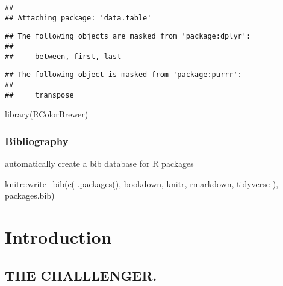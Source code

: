 \documentclass[
]{book}
\newenvironment{Shaded}{\begin{snugshade}}{\end{snugshade}}
\newcommand{\FunctionTok}[1]{\textcolor[rgb]{0.00,0.00,0.00}{#1}}
\newcommand{\NormalTok}[1]{#1}
\newcommand{\SpecialCharTok}[1]{\textcolor[rgb]{0.00,0.00,0.00}{#1}}
\newcommand{\StringTok}[1]{\textcolor[rgb]{0.31,0.60,0.02}{#1}}
\begin{document}
\begin{verbatim}
## 
## Attaching package: 'data.table'
\end{verbatim}

\begin{verbatim}
## The following objects are masked from 'package:dplyr':
## 
##     between, first, last
\end{verbatim}

\begin{verbatim}
## The following object is masked from 'package:purrr':
## 
##     transpose
\end{verbatim}

\begin{Shaded}
\begin{Highlighting}[]
\FunctionTok{library}\NormalTok{(RColorBrewer)}
\end{Highlighting}
\end{Shaded}

\hypertarget{bibliography}{%
\subsection{Bibliography}\label{bibliography}}

automatically create a bib database for R packages

\begin{Shaded}
\begin{Highlighting}[]
\NormalTok{knitr}\SpecialCharTok{::}\FunctionTok{write\_bib}\NormalTok{(}\FunctionTok{c}\NormalTok{(}
  \FunctionTok{.packages}\NormalTok{(), }\StringTok{\textquotesingle{}bookdown\textquotesingle{}}\NormalTok{, }\StringTok{\textquotesingle{}knitr\textquotesingle{}}\NormalTok{, }\StringTok{\textquotesingle{}rmarkdown\textquotesingle{}}\NormalTok{, }\StringTok{\textquotesingle{}tidyverse\textquotesingle{}}
\NormalTok{), }\StringTok{\textquotesingle{}packages.bib\textquotesingle{}}\NormalTok{)}
\end{Highlighting}
\end{Shaded}

\hypertarget{intro}{%
\chapter{Introduction}\label{intro}}

\hypertarget{challenger}{%
\section{THE CHALLLENGER.}\label{challenger}}
\end{document}
